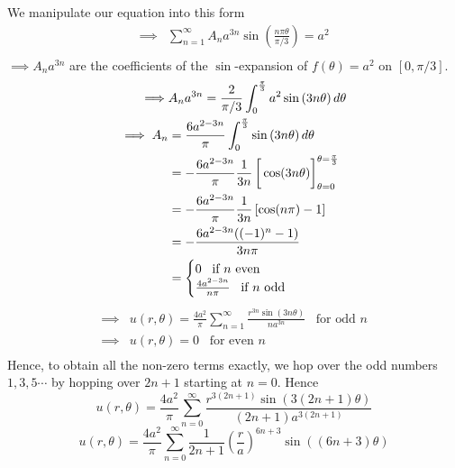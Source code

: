 \documentclass[12pt]{article}
\begin{document}
{We manipulate our equation into this form
\begin{align*}
\implies& \sum_{n=1}^{\infty} A_n a^{3n} \sin \left( \frac{n \pi \theta}{\pi / 3} \right) = a^2 \\
\end{align*}
$\implies A_n a^{3n}$ are the coefficients of the $\sin$-expansion of $f(\theta) = a^2$ on $\left[0, \pi/3 \right]$.
\begin{align*}
\implies& A_n a^{3n} = \frac{2}{\pi/3} \int_0 ^{\frac{\pi}{3}} a^2 \sin \left( 3n\theta \right) d\theta \\
\implies A_n &= \frac{6a^{2 - 3n}}{\pi} \int_0 ^{\frac{\pi}{3}} \sin \left( 3n\theta \right) d\theta \\
&= -\frac{6a^{2 - 3n}}{\pi} \frac{1}{3n} \left[ \vphantom{\frac{1}{3}} \cos (3n\theta) \right]_{\theta=0}^{\theta = \frac{\pi}{3}} \\
&= -\frac{6a^{2 - 3n}}{\pi} \frac{1}{3n} \left[ \cos(n\pi) - 1 \right] \\
&= -\frac{6a^{2 - 3n} ((-1)^n - 1)}{3n\pi} \\
&=  \begin{cases}
0 \;\;\; \text{if $n$ even} \\
\frac{4 a^{2 - 3n}}{n\pi} \;\;\; \text{if $n$ odd}
\end{cases}\\
\end{align*}
\begin{align*}
\implies& u(r, \theta) = \frac{4a^2}{\pi}\sum_{n=1}^{\infty}  \frac{ r^{3n} \sin \left( 3n \theta \right)}{na^{3n}} \;\;\; \text{for odd $n$} \\
\implies& u(r, \theta) = 0 \;\;\; \text{for even $n$} \\
\end{align*}
Hence, to obtain all the non-zero terms exactly, we hop over the odd numbers $1,3,5 \cdots$ by hopping over $2n + 1$ starting at $n=0$. Hence  \\
$$u(r, \theta) = \frac{4a^2}{\pi}\sum_{n=0}^{\infty}  \frac{ r^{3(2n + 1)} \sin \left( 3(2n + 1)\theta \right)}{(2n+1)a^{3(2n+1)}}$$
$$\boxed{u(r, \theta) = \frac{4a^2}{\pi}\sum_{n=0}^{\infty} \frac{1}{2n + 1} \left( \frac{r}{a} \right)^{6n+3} \sin((6n + 3)\theta)}$$
}

\vspace{0.3in}
\end{document}
